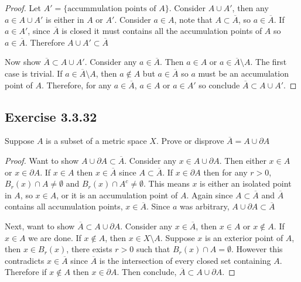 \documentclass{tufte-book}
\theoremstyle{mytheoremstyle}
\theoremstyle{mylemstyle}
\theoremstyle{mydefstyle}
\begin{document}
\begin{proof}
Let $A'=\{ \text{accummulation points of }A\}$. Consider $A \cup A'$, then any $a \in A \cup A'$ is either in $A$ or $A'$.  Consider $a \in A$, note that $A \subset \overline{A}$, so $a \in \overline{A}$.  If $a \in A'$, since $\overline{A}$ is closed it must contains all the accumulation points of $A$ so $a \in \overline{A}$.  Therefore $A \cup A' \subset \overline{A}$

Now show $\overline{A} \subset A \cup A'$.  Consider any $a \in \overline{A}$.  Then $a \in A$ or $a \in \overline{A}\setminus A$. The first case is trivial. If $a \in \overline{A}\setminus A$, then $a \notin A$ but $a \in \overline{A}$ so $a$ must be an accumulation point of $A$.  Therefore, for any $a \in \overline{A}$, $a \in A$ or $a \in A'$ so conclude $\overline{A} \subset A \cup A'$.
\end{proof}

\subsection{Exercise 3.3.32}
Suppose $A$ is a subset of a metric space $X$.  Prove or disprove $\overline{A} = A\cup \partial A$

\begin{proof}
Want to show $A\cup \partial A \subset \overline{A}$. Consider any $x \in A \cup \partial A$. Then either $x \in A$ or $x \in \partial A$.  If $x \in A$ then $x \in \overline{A}$ since $A \subset \overline{A}$.  If $x \in \partial A$ then for any $r>0$, $B_r(x) \cap A \neq \emptyset$ and $B_r(x) \cap A^c \neq \emptyset$.  This means $x$ is either an isolated point in $A$, so $x \in A$, or it is an accumulation point of $A$.  Again since $A \subset \overline{A}$ and $\overline{A}$ contains all accumulation points, $x \in \overline{A}$.  Since $a$ was arbitrary, $A\cup \partial A \subset \overline{A}$

Next, want to show $\overline{A} \subset A\cup \partial A$.  Consider any $x \in \overline{A}$, then $x \in A$ or $x \notin A$. If $x \in A$ we are done.  If $x \notin A$, then $x \in X \setminus A$.  Suppose $x$ is an exterior point of $A$, then $x \in B_r(x)$, there exists $r >0$ such that $B_r(x) \cap A = \emptyset$. However this contradicts $x \in \overline{A}$ since $\overline{A}$ is the intersection of every closed set containing $A$.  Therefore if $x \notin A$ then $x \in \partial A$.  Then conclude, $\overline{A} \subset A\cup \partial A$.
\end{proof}
\end{document}
